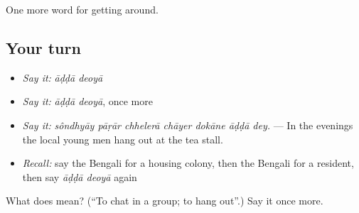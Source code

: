 \begin{grammarlens}[title={What you've built}]
One more word for getting around.
\end{grammarlens}

\subsection*{Your turn}
\begin{itemize}
\raggedright
  \item \emph{Say it:} \emph{āḍḍā deoyā}
  \item \emph{Say it:} \emph{āḍḍā deoyā}, once more
  \item \emph{Say it:} \emph{sôndhyāy pāṛār chhelerā chāyer dokāne āḍḍā dey.} — In the evenings the local young men hang out at the tea stall.
  \item \emph{Recall:} say the Bengali for a housing colony, then the Bengali for a resident, then say \emph{āḍḍā deoyā} again
\end{itemize}

\begin{tcolorbox}[breakable,colback=teal!4,colframe=teal!35!black,title={Before you move on}]
What does   mean? (\textquotedblleft{}To chat in a group; to hang out\textquotedblright{}.) Say it once more.
\end{tcolorbox}
